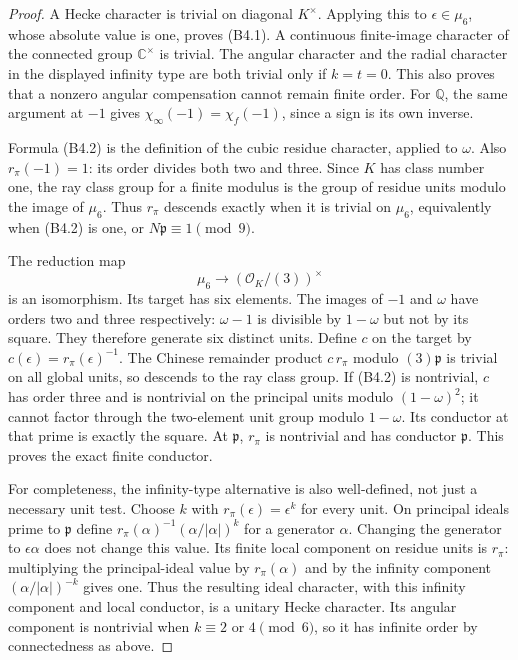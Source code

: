 \begin{proof}
A Hecke character is trivial on diagonal $K^\times$.
Applying this to $\epsilon\in\mu_6$, whose absolute value
is one, proves (B4.1). A continuous finite-image character
of the connected group $\mathbb C^\times$ is trivial.
The angular character and the radial character in the
displayed infinity type are both trivial only if $k=t=0$.
This also proves that a nonzero angular compensation cannot
remain finite order. For $\mathbb Q$, the same argument
at $-1$ gives $\chi_\infty(-1)=\chi_f(-1)$, since a sign
is its own inverse.

Formula (B4.2) is the definition of the cubic residue
character, applied to $\omega$. Also $r_\pi(-1)=1$:
its order divides both two and three. Since $K$ has class
number one, the ray class group for a finite modulus is
the group of residue units modulo the image of $\mu_6$.
Thus $r_\pi$ descends exactly when it is trivial on $\mu_6$,
equivalently when (B4.2) is one, or
$N\mathfrak p\equiv1\pmod9$.

The reduction map
\[
                 \mu_6\longrightarrow(\mathcal O_K/(3))^\times
\]
is an isomorphism. Its target has six elements. The images
of $-1$ and $\omega$ have orders two and three respectively:
$\omega-1$ is divisible by $1-\omega$ but not by its square.
They therefore generate six distinct units. Define $c$ on
the target by $c(\epsilon)=r_\pi(\epsilon)^{-1}$.
The Chinese remainder product $c\,r_\pi$ modulo
$(3)\mathfrak p$ is trivial on all global units, so descends
to the ray class group. If (B4.2) is nontrivial, $c$ has
order three and is nontrivial on the principal units
modulo $(1-\omega)^2$; it cannot factor through the
two-element unit group modulo $1-\omega$. Its conductor
at that prime is exactly the square. At $\mathfrak p$,
$r_\pi$ is nontrivial and has conductor $\mathfrak p$.
This proves the exact finite conductor.

For completeness, the infinity-type alternative is also
well-defined, not just a necessary unit test. Choose
$k$ with $r_\pi(\epsilon)=\epsilon^k$ for every unit.
On principal ideals prime to $\mathfrak p$ define
$r_\pi(\alpha)^{-1}(\alpha/|\alpha|)^k$ for a generator
$\alpha$. Changing the generator to $\epsilon\alpha$
does not change this value. Its finite local component on
residue units is $r_\pi$: multiplying the principal-ideal
value by $r_\pi(\alpha)$ and by the infinity component
$(\alpha/|\alpha|)^{-k}$ gives one. Thus the resulting
ideal character, with this infinity component and local
conductor, is a unitary Hecke character. Its angular
component is nontrivial when $k\equiv2$ or $4\pmod6$,
so it has infinite order by connectedness as above.
\end{proof}

